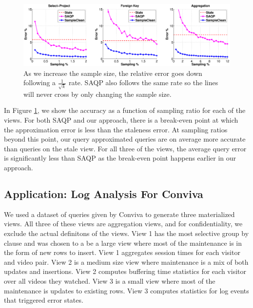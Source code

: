 \begin{figure}[ht!]
\label{exp1sample}
\hspace{-3.5em}
 \includegraphics[scale=0.21]{exp/exp1-samplesize-accuracy.eps}
 \caption{As we increase the sample size, the relative error goes down following a $\frac{1}{\sqrt{k}}$ rate. SAQP also follows the same rate so the lines will never cross by only changing the sample size.}
\end{figure}

In Figure \ref{exp1sample}, we show the accuracy as a function of sampling ratio for each of the views.
For both SAQP and our approach, there is a break-even point at which the approximation error is less than the staleness error.
At sampling ratios beyond this point, our query approximated queries are on average more accurate than queries on the stale view.
For all three of the views, the average query error is significantly less than SAQP as the break-even point happens earlier in our approach.

\subsection{Application: Log Analysis For Conviva}
We used a dataset of queries given by Conviva to generate three materialized views.
All three of these views are aggregation views, and for confidentiality, we exclude the actual definitons of the views. 
View 1 has the most selective group by clause and was chosen to a be a large view where most of the maintenance is in the form of new rows to insert.
View 1 aggregates session times for each visitor and video pair.
View 2 is a medium size view where maintenance is a mix of both updates and insertions.
View 2 computes buffering time statistics for each visitor over all videos they watched.
View 3 is a small view where most of the maintenance is updates to existing rows.
View 3 computes statistics for log events that triggered error states.


